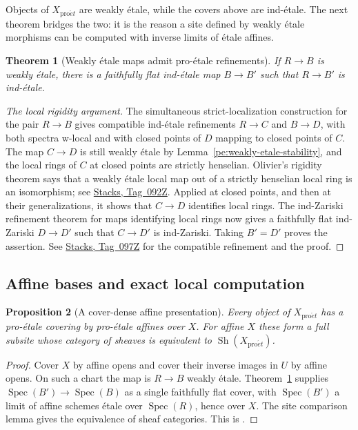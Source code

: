 \documentclass[11pt,a4paper]{article}
\numberwithin{equation}{section}
\newtheorem{theorem}{Theorem}[section]
\newtheorem{proposition}[theorem]{Proposition}
\theoremstyle{definition}
\theoremstyle{remark}
\newcommand{\Sh}{\operatorname{Sh}}
\newcommand{\proet}{\mathrm{pro}\acute{e}t}
\newcommand{\stacks}[1]{\href{https://stacks.math.columbia.edu/tag/#1}{\textnormal{Stacks, Tag~#1}}}
\begin{document}
Objects of $X_{\proet}$ are weakly \'etale, while the covers above are
ind-\'etale. The next theorem bridges the two: it is the reason a site
defined by weakly \'etale morphisms can be computed with inverse limits
of \'etale affines.

\begin{theorem}[Weakly \'etale maps admit pro-\'etale refinements]
\label{pe:indetale-refinement}
If $R\to B$ is weakly \'etale, there is a faithfully flat
ind-\'etale map $B\to B'$ such that $R\to B'$ is ind-\'etale.
\end{theorem}
\begin{proof}[The local rigidity argument]
The simultaneous strict-localization construction for the pair
$R\to B$ gives compatible ind-\'etale refinements $R\to C$
and $B\to D$, with both spectra w-local and with closed points of
$D$ mapping to closed points of $C$. The map $C\to D$ is still weakly
\'etale by Lemma~\ref{pe:weakly-etale-stability}, and the local rings
of $C$ at closed points are strictly henselian. Olivier's rigidity
theorem says that a weakly \'etale local map out of a strictly
henselian local ring is an isomorphism; see \stacks{092Z}. Applied at
closed points, and then at their generalizations, it shows that
$C\to D$ identifies local rings. The ind-Zariski refinement theorem for
maps identifying local rings now gives a faithfully flat ind-Zariski
$D\to D'$ such that $C\to D'$ is ind-Zariski. Taking $B'=D'$ proves
the assertion. See \stacks{097Z} for the compatible refinement and the
proof.
\end{proof}

\subsection{Affine bases and exact local computation}

\begin{proposition}[A cover-dense affine presentation]
\label{pe:affine-basis}
Every object of $X_{\proet}$ has a pro-\'etale covering by
pro-\'etale affines over $X$. For affine $X$ these form a full subsite
whose category of sheaves is equivalent to $\Sh(X_{\proet})$.
\end{proposition}
\begin{proof}
Cover $X$ by affine opens and cover their inverse images in $U$ by
affine opens. On such a chart the map is $R\to B$ weakly \'etale.
Theorem~\ref{pe:indetale-refinement} supplies
$\operatorname{Spec}(B')\to\operatorname{Spec}(B)$ as a single
faithfully flat cover, with $\operatorname{Spec}(B')$ a limit of
affine schemes \'etale over $\operatorname{Spec}(R)$, hence over
$X$. The site comparison lemma gives the equivalence of sheaf
categories. This is \cite[Lemma~4.2.4]{BS}.
\end{proof}
\end{document}
